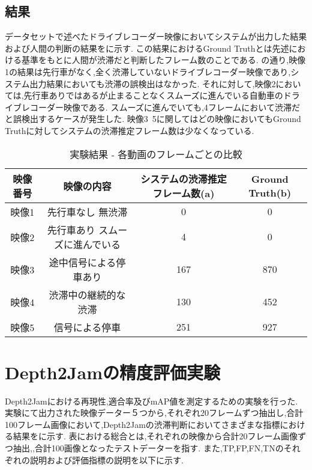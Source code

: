 \subsection{結果}
データセットで述べたドライブレコーダー映像においてシステムが出力した結果および人間の判断の結果をに示す.
この結果におけるGround Truthとは先述における基準をもとに人間が渋滞だと判断したフレーム数のことである.
の通り,映像1の結果は先行車がなく,全く渋滞していないドライブレコーダー映像であり,システム出力結果においても渋滞の誤検出はなかった.
それに対して,映像2においては,先行車ありではあるが止まることなくスムーズに進んでいる自動車のドライブレコーダー映像である.
スムーズに進んでいても,4フレームにおいて渋滞だと誤検出するケースが発生した.
映像3~5に関してはどの映像においてもGround Truthに対してシステムの渋滞推定フレーム数は少なくなっている.
\begin{table}[htbp]
  \centering
  \begin{scriptsize}
  \begin{tabular}{cccc}
  \toprule
映像番号 & 映像の内容 & システムの渋滞推定フレーム数(a) & Ground Truth(b)\\
  \midrule
映像1 & 先行車なし 無渋滞 & 0 & 0 \\
映像2 & 先行車あり スムーズに進んでいる & 4 & 0 \\
映像3 & 途中信号による停車あり & 167 & 870\\
映像4 & 渋滞中の継続的な渋滞 & 130 & 452\\
映像5 & 信号による停車 & 251 & 927 \\
\bottomrule
\end{tabular}
\end{scriptsize}
  \caption{実験結果 - 各動画のフレームごとの比較}
  \label{tab:exp3_fig}
\end{table}

\section{Depth2Jamの精度評価実験}
\label{sec:exp2}
Depth2Jamにおける再現性,適合率及びmAP値を測定するための実験を行った.
実験にて出力された映像データー５つから,それぞれ20フレームずつ抽出し,合計100フレーム画像において,Depth2Jamの渋滞判断においてさまざまな指標における結果をに示す.
表における総合とは,それぞれの映像から合計20フレーム画像ずつ抽出,,合計100画像となったテストデーターを指す.
また,TP,FP,FN,TNのそれぞれの説明および評価指標の説明を以下に示す.

